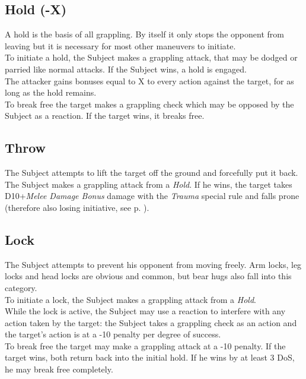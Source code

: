 \subsection*{Hold (-X)}
A hold is the basis of all grappling. By itself it only stops the opponent from leaving but it is necessary for most other maneuvers to initiate.\\
To initiate a hold, the Subject makes a grappling attack,
	that may be dodged or parried like normal attacks.
If the Subject wins, a hold is engaged.
\\%
The attacker gains bonuses equal to X to every action against the target, for as long as the hold remains.\\
To break free the target makes a grappling check which may be opposed by the Subject as a reaction. If the target wins, it breaks free.
\subsection*{Throw}
The Subject attempts to lift the target off the ground and forcefully put it back.\\
The Subject makes a grappling attack from a \emph{Hold}.
If he wins,
	the target takes D10+\emph{Melee Damage Bonus} damage
	with the \emph{Trauma} special rule
	and falls prone
	(therefore also losing initiative, see p. \pageref{subsec:variableini}).
\subsection*{Lock}
The Subject attempts to prevent his opponent from moving freely.
Arm locks, leg locks and head locks are obvious and common,
	but bear hugs also fall into this category.
\\%
To initiate a lock, the Subject makes a grappling attack from a \emph{Hold}.
\\%
While the lock is active,
	the Subject may use a reaction to interfere with any action taken by the target:
	the Subject takes a grappling check as an action
	and the target’s action is at a -10 penalty per degree of success.\\
To break free the target may make a grappling attack at a -10  penalty.
If the target wins, both return back into the initial hold.
If he wins by at least 3 DoS, he may break free completely.

